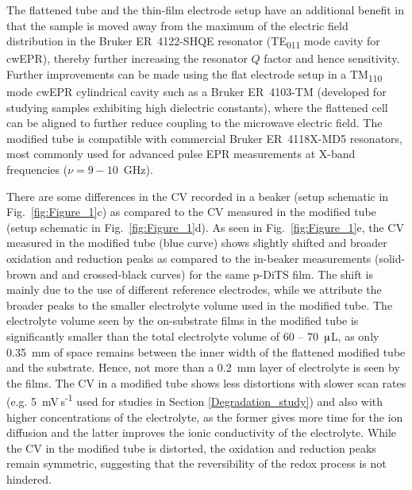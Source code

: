 \par
The flattened tube and the thin-film electrode setup have an additional benefit in that the sample is moved away from the maximum of the electric field distribution in the Bruker ER~4122-SHQE resonator (TE\textsubscript{011} mode cavity for cwEPR), thereby further increasing the resonator $Q$ factor and hence sensitivity. Further improvements can be made using the flat electrode setup in a TM\textsubscript{110} mode cwEPR cylindrical cavity such as a Bruker ER~4103-TM (developed for studying samples exhibiting high dielectric constants), where the flattened cell can be aligned to further reduce coupling to the microwave electric field. The modified tube is compatible with commercial Bruker ER~4118X-MD5 resonators, most commonly used for advanced pulse EPR measurements at X-band frequencies ($\nu = 9-10$~GHz).\\

\par
There are some differences in the CV recorded in a beaker (setup schematic in Fig.~\ref{fig:Figure_1}c) as compared to the CV measured in the modified tube (setup schematic in Fig.~\ref{fig:Figure_1}d). As seen in Fig.~\ref{fig:Figure_1}e, the CV measured in the modified tube (blue curve) shows slightly shifted and broader oxidation and reduction peaks as compared to the in-beaker measurements (solid-brown and and crossed-black curves) for the same p-DiTS film. The shift is mainly due to the use of different reference electrodes, while we attribute the broader peaks to the smaller electrolyte volume used in the modified tube. The electrolyte volume seen by the on-substrate films in the modified tube is significantly smaller than the total electrolyte volume of 60 -- 70~$\muup$L, as only 0.35~mm of space remains between the inner width of the flattened modified tube and the substrate. Hence, not more than a 0.2~mm layer of electrolyte is seen by the films. The CV in a modified tube shows less distortions with slower scan rates (e.g. 5~mV\,s\textsuperscript{-1} used for studies in Section \ref{Degradation_study}) and also with higher concentrations of the electrolyte, as the former gives more time for the ion diffusion and the latter improves the ionic conductivity of the electrolyte. While the CV in the modified tube is distorted, the oxidation and reduction peaks remain symmetric, suggesting that the reversibility of the redox process is not hindered.



